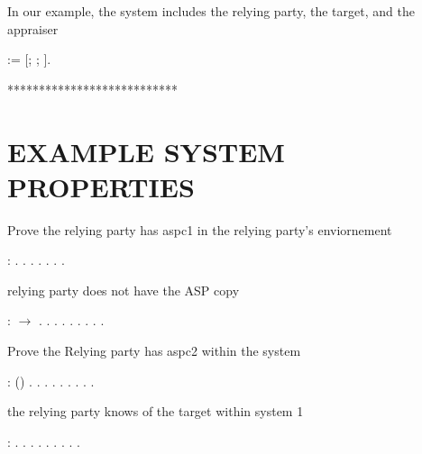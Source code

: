 \documentclass[12pt]{report}
\begin{document}
In our example, the system includes the relying party, the target, and the appraiser 
\begin{coqdoccode}
\coqdocemptyline
\coqdocnoindent
{}  := [; ; ].\coqdoceol
\coqdocemptyline
\end{coqdoccode}
***************************
\section{EXAMPLE SYSTEM PROPERTIES}




 Prove the relying party has aspc1 in the relying party's enviornement 
\begin{coqdoccode}
\coqdocemptyline
\coqdocnoindent
{} :    .\coqdoceol
\coqdocnoindent
{}.  . . . . .\coqdoceol
\coqdocemptyline
\end{coqdoccode}
relying party does not have the ASP copy 
\begin{coqdoccode}
\coqdocemptyline
\coqdocnoindent
{} :     \ensuremath{\rightarrow} .\coqdoceol
\coqdocnoindent
{}.  . . .  .  . . .\coqdoceol
\coqdocemptyline
\end{coqdoccode}
Prove the Relying party has aspc2 within the system 
\begin{coqdoccode}
\coqdocemptyline
\coqdocnoindent
{} :   () .\coqdoceol
\coqdocnoindent
{}.  .  . . . . . .\coqdoceol
\coqdocemptyline
\end{coqdoccode}
the relying party knows of the target within system 1
\begin{coqdoccode}
\coqdocemptyline
\coqdocnoindent
{} :    .\coqdoceol
\coqdocnoindent
{}.\coqdoceol
\coqdocnoindent
{} . . .  . . .\coqdoceol
\coqdocnoindent
{}.\coqdoceol
\coqdocemptyline
\end{coqdoccode}
\end{document}
